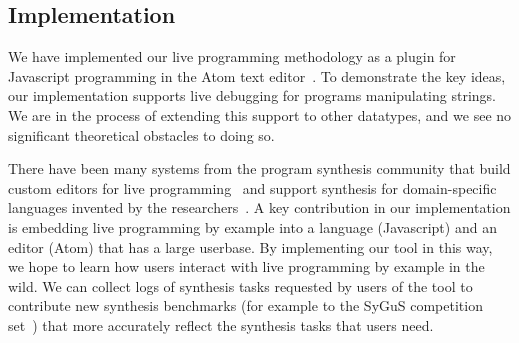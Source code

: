 \subsection{Implementation}
We have implemented our live programming methodology as a plugin
for Javascript programming in the Atom text editor~\cite{Atom}.
To demonstrate the key ideas, our implementation supports live debugging for programs manipulating strings.
We are in the process of extending this support to other datatypes,
and we see no significant theoretical obstacles to doing so.

There have been many systems from the program synthesis community that build custom editors for live programming~\cite{} and support synthesis for domain-specific languages invented by the researchers~\cite{}.
A key contribution in our implementation is embedding live programming by example into a language (Javascript) and an editor (Atom) that has a large userbase.
By implementing our tool in this way, we hope to learn how users interact with live programming by example in the wild.
We can collect logs of synthesis tasks requested by users of the tool to contribute new synthesis benchmarks (for example to the SyGuS competition set~\cite{}) that more accurately reflect the synthesis tasks that users need.


